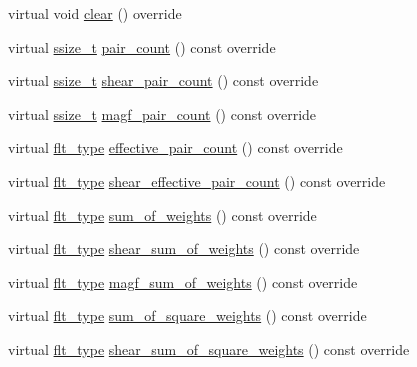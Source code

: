 \begin{DoxyCompactItemize}
\item 
virtual void \hyperlink{classIceBRG_1_1pair__bin_accb7e0a9d26acf6b3444160f2c3718c5}{clear} () override
\item 
virtual \hyperlink{lib_2IceBRG__main_2common_8h_ab322a3e50421dc5f0c43316b1b373592}{ssize\-\_\-t} \hyperlink{classIceBRG_1_1pair__bin_aa925118f3137ef62adac11917cdd43a6}{pair\-\_\-count} () const override
\item 
virtual \hyperlink{lib_2IceBRG__main_2common_8h_ab322a3e50421dc5f0c43316b1b373592}{ssize\-\_\-t} \hyperlink{classIceBRG_1_1pair__bin_ae850b22e0eebeb779abfd116ba2e9c4d}{shear\-\_\-pair\-\_\-count} () const override
\item 
virtual \hyperlink{lib_2IceBRG__main_2common_8h_ab322a3e50421dc5f0c43316b1b373592}{ssize\-\_\-t} \hyperlink{classIceBRG_1_1pair__bin_ad1d60049cc8739ceffe806ee83d5885e}{magf\-\_\-pair\-\_\-count} () const override
\item 
virtual \hyperlink{lib_2IceBRG__main_2common_8h_ad0f130a56eeb944d9ef2692ee881ecc4}{flt\-\_\-type} \hyperlink{classIceBRG_1_1pair__bin_a5d3541adaae91d9ce3e21808990fde3c}{effective\-\_\-pair\-\_\-count} () const override
\item 
virtual \hyperlink{lib_2IceBRG__main_2common_8h_ad0f130a56eeb944d9ef2692ee881ecc4}{flt\-\_\-type} \hyperlink{classIceBRG_1_1pair__bin_a2c2e3a12667cd62ae33ba9fb7cc32a6f}{shear\-\_\-effective\-\_\-pair\-\_\-count} () const override
\item 
virtual \hyperlink{lib_2IceBRG__main_2common_8h_ad0f130a56eeb944d9ef2692ee881ecc4}{flt\-\_\-type} \hyperlink{classIceBRG_1_1pair__bin_a40a7e3fb147261cd1e7a27941e539782}{sum\-\_\-of\-\_\-weights} () const override
\item 
virtual \hyperlink{lib_2IceBRG__main_2common_8h_ad0f130a56eeb944d9ef2692ee881ecc4}{flt\-\_\-type} \hyperlink{classIceBRG_1_1pair__bin_a83548bff5f98aaa82a962e399b00cc62}{shear\-\_\-sum\-\_\-of\-\_\-weights} () const override
\item 
virtual \hyperlink{lib_2IceBRG__main_2common_8h_ad0f130a56eeb944d9ef2692ee881ecc4}{flt\-\_\-type} \hyperlink{classIceBRG_1_1pair__bin_aa0628069056a8128ff35c30bcc9a4f0e}{magf\-\_\-sum\-\_\-of\-\_\-weights} () const override
\item 
virtual \hyperlink{lib_2IceBRG__main_2common_8h_ad0f130a56eeb944d9ef2692ee881ecc4}{flt\-\_\-type} \hyperlink{classIceBRG_1_1pair__bin_a561b0ec911ba8f12b49dd7fc0414945e}{sum\-\_\-of\-\_\-square\-\_\-weights} () const override
\item 
virtual \hyperlink{lib_2IceBRG__main_2common_8h_ad0f130a56eeb944d9ef2692ee881ecc4}{flt\-\_\-type} \hyperlink{classIceBRG_1_1pair__bin_a46fa56e1ed62cb416d0052f0c65bcfec}{shear\-\_\-sum\-\_\-of\-\_\-square\-\_\-weights} () const override

\end{DoxyCompactItemize}
